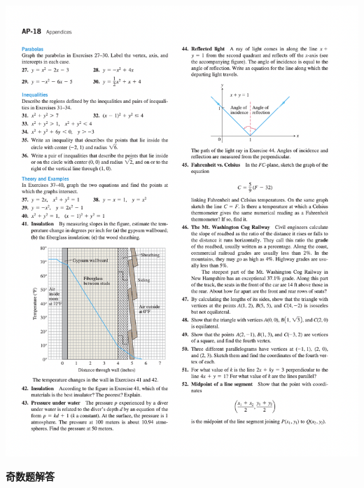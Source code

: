 \documentclass{report}
\begin{document}
\begin{center}
    \includegraphics[width=\textwidth]{./content2.png}
\end{center}
\newpage
\noindent\textbf{奇数题解答}
\end{document}
